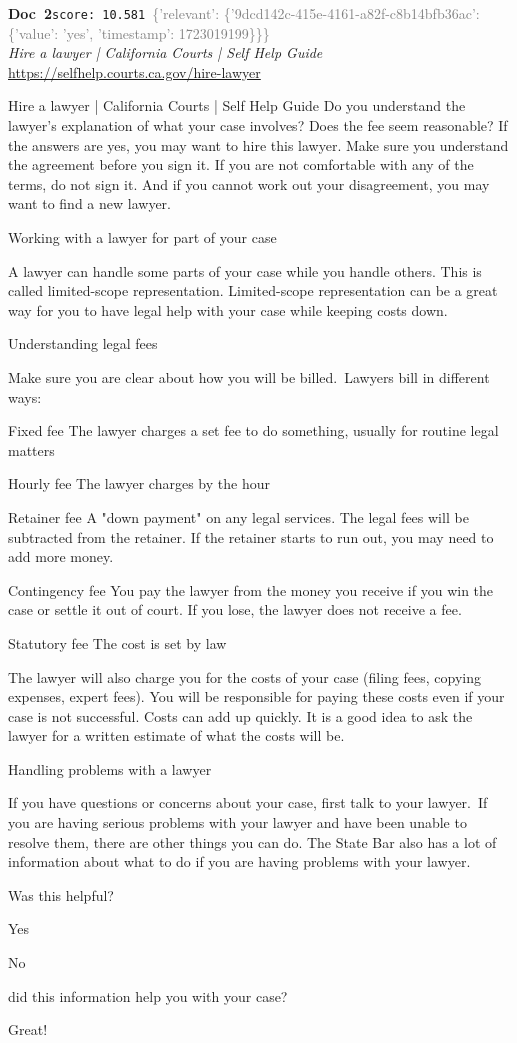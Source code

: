 \documentclass[a4paper,11pt]{article}
\begin{document}
\begin{docenv}
{\footnotesize\textcolor{doccolor}{\textbf{Doc~2}}}\hfill{\tiny\texttt{score:~10.581}}\ {\tiny\textcolor{gray}{\{'relevant': \{'9dcd142c-415e-4161-a82f-c8b14bfb36ac': \{'value': 'yes', 'timestamp': 1723019199\}\}\}}}\\[3pt]
{\small\textit{Hire a lawyer | California Courts | Self Help Guide}}\\[2pt]
{\tiny\url{https://selfhelp.courts.ca.gov/hire-lawyer}}\\[4pt]
{\footnotesize Hire a lawyer | California Courts | Self Help Guide
Do you understand the lawyer's explanation of what your case involves?
Does the fee seem reasonable?
If the answers are yes, you may want to hire this lawyer. Make sure you understand the agreement before you sign it. If you are not comfortable with any of the terms, do not sign it. And if you cannot work out your disagreement, you may want to find a new lawyer.

 Working with a lawyer for part of your case

 A lawyer can handle some parts of your case while you handle others. This is called limited-scope representation. Limited-scope representation can be a great way for you to have legal help with your case while keeping costs down.

 Understanding legal fees

 Make sure you are clear about how you will be billed. Lawyers bill in different ways:

Fixed fee
The lawyer charges a set fee to do something, usually for routine legal matters

Hourly fee
The lawyer charges by the hour

Retainer fee
A "down payment" on any legal services. The legal fees will be subtracted from the retainer. If the retainer starts to run out, you may need to add more money.

Contingency fee
You pay the lawyer from the money you receive if you win the case or settle it out of court. If you lose, the lawyer does not receive a fee.

Statutory fee
The cost is set by law

The lawyer will also charge you for the costs of your case (filing fees, copying expenses, expert fees). You will be responsible for paying these costs even if your case is not successful. Costs can add up quickly. It is a good idea to ask the lawyer for a written estimate of what the costs will be.

 Handling problems with a lawyer

 If you have questions or concerns about your case, first talk to your lawyer. If you are having serious problems with your lawyer and have been unable to resolve them, there are other things you can do.
The State Bar also has a lot of information about what to do if you are having problems with your lawyer.

 

Was this helpful?

Yes

No

did this information help you with your case?

Great!}
\end{docenv}
\end{document}

